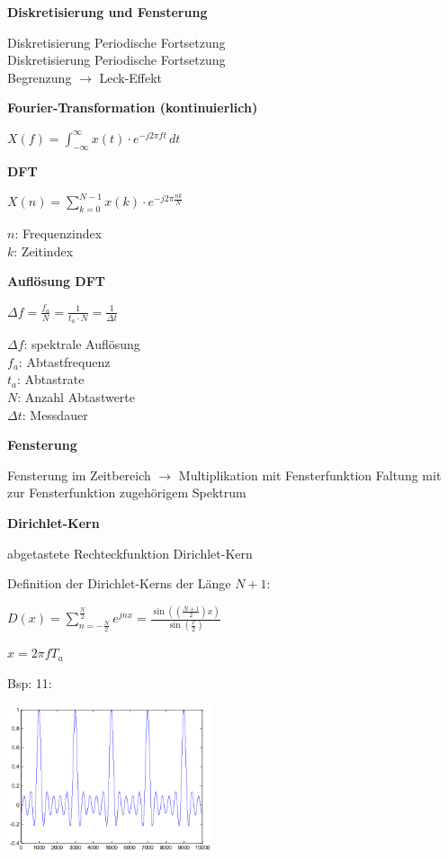 \textbf{Diskretisierung und Fensterung}

Diskretisierung \laplace \; Periodische Fortsetzung\\
Diskretisierung \Laplace \; Periodische Fortsetzung\\
Begrenzung $\rightarrow$ Leck-Effekt

\textbf{Fourier-Transformation (kontinuierlich)}

$\displaystyle{
    X(f) = \int_{-\infty}^{\infty} x(t) \cdot e^{-j2\pi ft} \, dt
}$

\textbf{DFT}

$\displaystyle{
    X(n) = \sum_{k=0}^{N-1} x(k) \cdot e^{-j2\pi \frac{nk}{N}}
}$

$n$: Frequenzindex\\
$k$: Zeitindex

\textbf{Auflösung DFT}

$\displaystyle{
    \Delta f = \frac{f_a}{N} = \frac{1}{t_a \cdot N} = \frac{1}{\Delta t}
}$

$\Delta f$: spektrale Auflösung\\
$f_a$: Abtastfrequenz\\
$t_a$: Abtastrate\\
$N$: Anzahl Abtastwerte\\
$\Delta t$: Messdauer

\textbf{Fensterung}

Fensterung im Zeitbereich $\rightarrow$ Multiplikation mit Fensterfunktion \laplace \; Faltung mit zur Fensterfunktion zugehörigem Spektrum

\textbf{Dirichlet-Kern}

abgetastete Rechteckfunktion \laplace \; Dirichlet-Kern

Definition der Dirichlet-Kerns der Länge $N+1$:

$\displaystyle{
    D(x) = \sum_{n=-\frac{N}{2}}^{\frac{N}{2}} e^{jnx} =
    \frac{\sin\left( \left( \frac{N + 1}{2} \right) x \right)}{\sin\left( \frac{x}{2} \right)}
}$

$x = 2\pi fT_a$

Bsp: 11:

\includegraphics[width=6cm]{img/dirichlet-kern.png}


